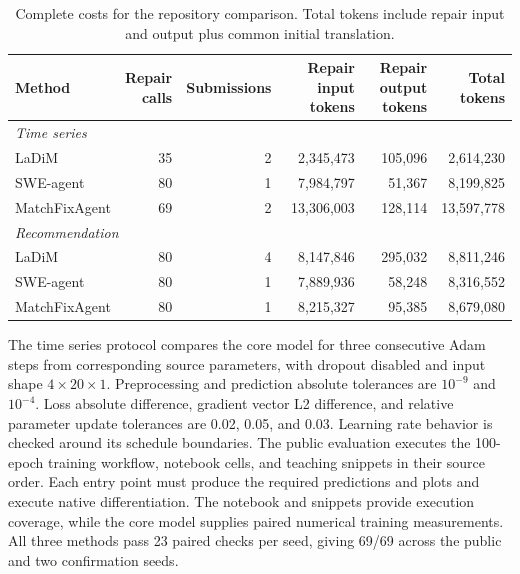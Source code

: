 \documentclass{article}
\newcommand{\thead}[1]{\textbf{\shortstack[b]{#1}}}
\begin{document}
\begin{table}[!htb]
\caption{Complete costs for the repository comparison. Total tokens include repair input and output plus common initial translation.}
\label{tab:repository-costs}
\centering
\small
\setlength{\tabcolsep}{3pt}

\begin{tabular*}{\linewidth}{@{\extracolsep{\fill}}lrrrrr@{}}
\toprule
\textbf{Method} & \thead{Repair\\calls} & \textbf{Submissions} & \thead{Repair input\\tokens} & \thead{Repair output\\tokens} & \thead{Total\\tokens} \\
\midrule
\multicolumn{6}{l}{\textit{Time series}} \\
LaDiM & 35 & 2 & 2,345,473 & 105,096 & 2,614,230 \\
SWE-agent & 80 & 1 & 7,984,797 & 51,367 & 8,199,825 \\
MatchFixAgent & 69 & 2 & 13,306,003 & 128,114 & 13,597,778 \\
\midrule
\multicolumn{6}{l}{\textit{Recommendation}} \\
LaDiM & 80 & 4 & 8,147,846 & 295,032 & 8,811,246 \\
SWE-agent & 80 & 1 & 7,889,936 & 58,248 & 8,316,552 \\
MatchFixAgent & 80 & 1 & 8,215,327 & 95,385 & 8,679,080 \\
\bottomrule
\end{tabular*}


\end{table}

The time series protocol compares the core model for three consecutive Adam steps from corresponding source parameters, with dropout disabled and input shape $4\times20\times1$. Preprocessing and prediction absolute tolerances are $10^{-9}$ and $10^{-4}$. Loss absolute difference, gradient vector L2 difference, and relative parameter update tolerances are 0.02, 0.05, and 0.03. Learning rate behavior is checked around its schedule boundaries. The public evaluation executes the 100-epoch training workflow, notebook cells, and teaching snippets in their source order. Each entry point must produce the required predictions and plots and execute native differentiation. The notebook and snippets provide execution coverage, while the core model supplies paired numerical training measurements. All three methods pass 23 paired checks per seed, giving 69/69 across the public and two confirmation seeds.
\end{document}
